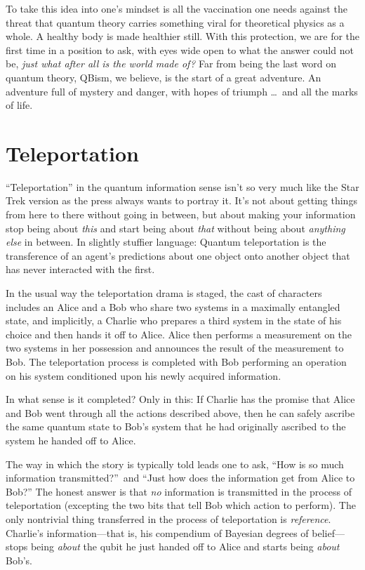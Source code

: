 \documentclass[aps,pra,superscriptaddress,10pt,tightenlines,twocolumn,nofootinbib]{revtex4}
\begin{document}
To take this idea into one's mindset is all the vaccination one needs against the threat that quantum theory carries something viral for theoretical physics as a whole.  A healthy body is made healthier still.  With this protection, we are for the first time in a position to ask, with eyes wide open to what the answer could not be, {\it just what after all is the world made of?}  Far from being the last word on quantum theory, QBism, we believe, is the start of a great adventure.  An adventure full of mystery and danger, with hopes of triumph \ldots\ and all the marks of life.


\section{Teleportation}

``Teleportation'' in the quantum information sense isn't so very much
like the Star Trek version as the press always wants to portray it.
It's not about getting things from here to there without going in
between, but about making your information stop being about {\it this\/} and
start being about {\it that\/} without being about {\it anything else\/} in between.
In slightly stuffier language: Quantum teleportation is the
transference of an agent's predictions about one object onto another
object that has never interacted with the first.

In the usual way the teleportation drama is staged, the cast of
characters includes an Alice and a Bob who share two systems in a
maximally entangled state, and implicitly, a Charlie who prepares a
third system in the state of his choice and then hands it off to
Alice.  Alice then performs a measurement on the two systems in her
possession and announces the result of the measurement to Bob.  The
teleportation process is completed with Bob performing an operation on
his system conditioned upon his newly acquired information.

In what sense is it completed?  Only in this:  If Charlie has the
promise that Alice and Bob went through all the actions described
above, then he can safely ascribe the same quantum state to Bob's
system that he had originally ascribed to the system he handed off to
Alice.

The way in which the story is typically told leads one to ask, ``How is so much information transmitted?''\  and ``Just how does the information get from Alice to Bob?'' The honest answer is that  {\it no\/} information is transmitted in the process of teleportation (excepting the two bits that tell Bob which action to perform).  The only nontrivial thing transferred in the process of teleportation is {\it reference}.  Charlie's information---that is, his compendium of Bayesian degrees of belief---stops being {\it about\/} the qubit he just handed off to Alice and starts being {\it about\/} Bob's.
\end{document}
